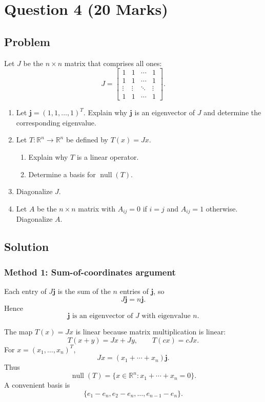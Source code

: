 \documentclass[12pt]{article}
\newcommand{\R}{\mathbb{R}}
\newcommand{\Null}{\operatorname{null}}
\begin{document}
\newpage
\section{Question 4 \hfill (20 Marks)}

\subsection{Problem}
Let $J$ be the $n\times n$ matrix that comprises all ones:
\[
J=\begin{bmatrix}1&1&\cdots&1\\1&1&\cdots&1\\\vdots&\vdots&\ddots&\vdots\\1&1&\cdots&1\end{bmatrix}.
\]
\begin{enumerate}[label=(\alph*)]
  \item Let $\mathbf j=(1,1,\ldots,1)^T$. Explain why $\mathbf j$ is an eigenvector of $J$ and determine the corresponding eigenvalue.
  \item Let $T:\R^n\to\R^n$ be defined by $T(x)=Jx$.
  \begin{enumerate}[label=(\roman*)]
    \item Explain why $T$ is a linear operator.
    \item Determine a basis for $\Null(T)$.
  \end{enumerate}
  \item Diagonalize $J$.
  \item Let $A$ be the $n\times n$ matrix with $A_{ij}=0$ if $i=j$ and $A_{ij}=1$ otherwise. Diagonalize $A$.
\end{enumerate}

\subsection{Solution}

\subsubsection{Method 1: Sum-of-coordinates argument}
Each entry of $J\mathbf j$ is the sum of the $n$ entries of $\mathbf j$, so
\[
J\mathbf j=n\mathbf j.
\]
Hence
\[
\boxed{\mathbf j\text{ is an eigenvector of }J\text{ with eigenvalue }n.}
\]

The map $T(x)=Jx$ is linear because matrix multiplication is linear:
\[
T(x+y)=Jx+Jy,
\qquad
T(cx)=cJx.
\]
For $x=(x_1,\ldots,x_n)^T$,
\[
Jx=(x_1+\cdots+x_n)\mathbf j.
\]
Thus
\[
\Null(T)=\{x\in\R^n:x_1+\cdots+x_n=0\}.
\]
A convenient basis is
\[
\boxed{\{e_1-e_n,
 e_2-e_n,
 \ldots,
 e_{n-1}-e_n\}.}
\]
\end{document}
